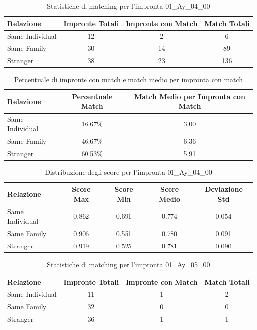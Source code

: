 \begin{table}[htbp]
\centering
\caption{Statistiche di matching per l'impronta 01\_Ay\_04\_00}
\label{tab:results_01_Ay_04_00}
\begin{tabular}{|l|c|c|c|}
\hline
\textbf{Relazione} & \textbf{Impronte Totali} & \textbf{Impronte con Match} & \textbf{Match Totali} \\
\hline
Same Individual & 12 & 2 & 6 \\
\hline
Same Family & 30 & 14 & 89 \\
\hline
Stranger & 38 & 23 & 136 \\
\hline
\end{tabular}
\end{table}


\begin{table}[htbp]
\centering
\caption{Percentuale di impronte con match e match medio per impronta con match}
\label{tab:match_percentage_01_Ay_04_00}
\begin{tabular}{|l|c|c|}
\hline
\textbf{Relazione} & \textbf{Percentuale Match} & \textbf{Match Medio per Impronta con Match} \\
\hline
Same Individual & 16.67\% & 3.00 \\
\hline
Same Family & 46.67\% & 6.36 \\
\hline
Stranger & 60.53\% & 5.91 \\
\hline
\end{tabular}
\end{table}


\begin{table}[htbp]
\centering
\caption{Distribuzione degli score per l'impronta 01\_Ay\_04\_00}
\label{tab:scores_01_Ay_04_00}
\begin{tabular}{|l|c|c|c|c|}
\hline
\textbf{Relazione} & \textbf{Score Max} & \textbf{Score Min} & \textbf{Score Medio} & \textbf{Deviazione Std} \\
\hline
Same Individual & 0.862 & 0.691 & 0.774 & 0.054 \\
\hline
Same Family & 0.906 & 0.551 & 0.780 & 0.091 \\
\hline
Stranger & 0.919 & 0.525 & 0.781 & 0.090 \\
\hline
\end{tabular}
\end{table}


\begin{table}[htbp]
\centering
\caption{Statistiche di matching per l'impronta 01\_Ay\_05\_00}
\label{tab:results_01_Ay_05_00}
\begin{tabular}{|l|c|c|c|}
\hline
\textbf{Relazione} & \textbf{Impronte Totali} & \textbf{Impronte con Match} & \textbf{Match Totali} \\
\hline
Same Individual & 11 & 1 & 2 \\
\hline
Same Family & 32 & 0 & 0 \\
\hline
Stranger & 36 & 1 & 1 \\
\hline
\end{tabular}
\end{table}


